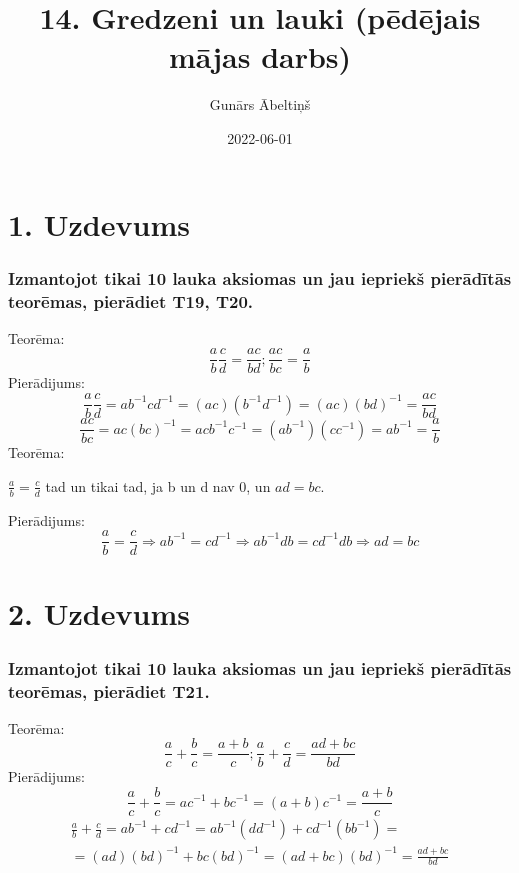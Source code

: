 \documentclass{article}
\title{14. Gredzeni un lauki (pēdējais mājas darbs)}
\author{Gunārs Ābeltiņš}
\date{2022-06-01}
\begin{document}
\maketitle

\section*{1. Uzdevums}
\subsubsection*{Izmantojot tikai 10 lauka aksiomas un jau iepriekš pierādītās \\ teorēmas, pierādiet T19, T20.}

Teorēma:
\begin{equation*}
    \frac{a}{b}\frac{c}{d}=\frac{ac}{bd}; \frac{ac}{bc}=\frac{a}{b}
\end{equation*}
Pierādijums:
\begin{equation*}
    \frac{a}{b}\frac{c}{d}=ab^{-1}cd^{-1}=(ac)(b^{-1}d^{-1})=(ac)(bd)^{-1}=\frac{ac}{bd}
\end{equation*}
\begin{equation*}
    \frac{ac}{bc}=ac(bc)^{-1}=acb^{-1}c^{-1}=(ab^{-1})(cc^{-1})=ab^{-1}=\frac{a}{b}
\end{equation*}
Teorēma:
\begin{center}
    $\frac{a}{b}=\frac{c}{d}$ tad un tikai tad, ja b un d nav 0, un $ad=bc$.
\end{center}
Pierādijums:
\begin{equation*}
    \frac{a}{b}=\frac{c}{d} \Rightarrow ab^{-1}=cd^{-1} \Rightarrow ab^{-1}db=cd^{-1}db \Rightarrow ad=bc
\end{equation*}

\section*{2. Uzdevums}
\subsubsection*{Izmantojot tikai 10 lauka aksiomas un jau iepriekš pierādītās \\ teorēmas, pierādiet T21.}

Teorēma:
\begin{equation*}
    \frac{a}{c}+\frac{b}{c}=\frac{a+b}{c};\frac{a}{b}+\frac{c}{d}=\frac{ad+bc}{bd}
\end{equation*}
Pierādijums:
\begin{equation*}
    \frac{a}{c}+\frac{b}{c}=ac^{-1}+bc^{-1}=(a+b)c^{-1}=\frac{a+b}{c}
\end{equation*}
\begin{gather*}
    \frac{a}{b}+\frac{c}{d}=ab^{-1}+cd^{-1}=ab^{-1}(dd^{-1})+cd^{-1}(bb^{-1})=\\
    =(ad)(bd)^{-1}+bc(bd)^{-1}=(ad+bc)(bd)^{-1}=\frac{ad+bc}{bd}
\end{gather*}
\end{document}
